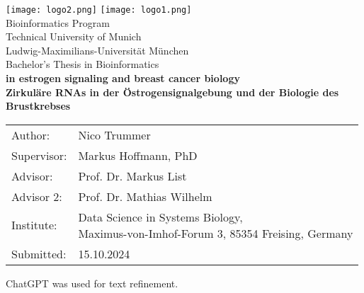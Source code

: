 \documentclass[pdftex,12pt,a4paper]{report}
\begin{document}
\begin{titlepage}
    {\sffamily

        \begin{center}
            \texttt{[image: logo2.png]}
            \hfill
            \texttt{[image: logo1.png]}
            \\[3cm]

            {\Large Bioinformatics Program}\\[0.5cm]
            {\Large Technical University of Munich}\\[0.5cm]
            {\Large Ludwig-Maximilians-Universit\"at M\"unchen}\\[1cm]
            {\Large Bachelor's Thesis in Bioinformatics}\\[1.5cm]
            {\textbf{\LARGE {} in estrogen signaling and
                breast cancer
                biology}}\\[1.5cm]
            {\textbf{\LARGE Zirkul\"are RNAs in der \"Ostrogensignalgebung und
                der
                Biologie des
                Brustkrebses}}\\[2cm]

        \end{center}

        \begin{center}\Large
            \begin{tabular}{ll}
                Author:    & Nico Trummer \\ Supervisor: & Markus Hoffmann, PhD \\ Advisor: &
                   Prof.
                   Dr.
                Markus List               \\ Advisor 2: & Prof.
                   Dr.
                Mathias Wilhelm           \\ Institute: & \makecell[l]{Data Science in Systems
                Biology,                  \\ Maximus-von-Imhof-Forum 3, 85354 Freising, Germany} \\
                Submitted: & 15.10.2024\end{tabular} \end{center} 

    } 

\end{titlepage} 

 \tableofcontents 





 

\printbibliography 

ChatGPT was used for text refinement.
\end{document}
